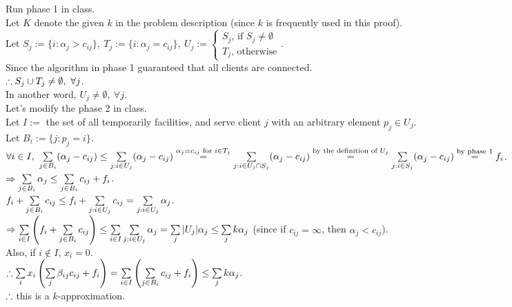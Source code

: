\begin{pr}
Run phase 1 in class.\\
Let $K$ denote the given $k$ in the problem description (since $k$ is frequently used in this proof).\\
Let $S_j:=\{i: \alpha_j>c_{ij}\},\ T_j:=\{i: \alpha_j=c_{ij}\},\ U_j:=\begin{cases}
S_j\text{, if }S_j\neq\emptyset\\
T_j\text{, otherwise}
\end{cases}$.\\
Since the algorithm in phase 1 guaranteed that all clients are connected.\\
$\therefore S_j\cup T_j\neq\emptyset,\ \forall j$.\\
In another word, $U_j\neq\emptyset,\ \forall j$.\\
Let's modify the phase 2 in class.\\
Let $I:=$ the set of all temporarily facilities, and serve client $j$ with an arbitrary element $p_j\in U_j$.\\
Let $B_i:=\{j:p_j=i\}$.\\
$\forall i\in I,\ \sum\limits_{j\in B_i}(\alpha_j-c_{ij})\leq\sum\limits_{j:i\in U_j}(\alpha_j-c_{ij})\overset{\alpha_j=c_{ij}\text{ for }i\in T_j}=\sum\limits_{j:i\in U_j\cap S_j}(\alpha_j-c_{ij})\overset{\text{by the definition of }U_j}=\sum\limits_{j:i\in S_j}(\alpha_j-c_{ij})\overset{\text{by phase 1}}=f_i$.\\
$\Rightarrow\sum\limits_{j\in B_i}\alpha_j\leq\sum\limits_{j\in B_i}c_{ij}+f_i$.\\
$f_i+\sum\limits_{j\in B_i}c_{ij}\leq f_i+\sum\limits_{j:i\in U_j}c_{ij}=\sum\limits_{j:i\in U_j}\alpha_j$.\\
$\Rightarrow\sum\limits_{i\in I}\left(f_i+\sum\limits_{j\in B_i}c_{ij}\right)\leq\sum\limits_{i\in I}\sum\limits_{j:i\in U_j}\alpha_j=\sum\limits_j|U_j|\alpha_j\leq\sum\limits_jk\alpha_j$ (since if $c_{ij}=\infty$, then $\alpha_j<c_{ij}$).\\
Also, if $i\notin I$, $x_i=0$.\\
$\therefore\sum\limits_ix_i\left(\sum\limits_j\beta_{ij}c_{ij}+f_i\right)=\sum\limits_{i\in I}\left(\sum\limits_{j\in B_i}c_{ij}+f_i\right)\leq\sum\limits_jk\alpha_j$.\\
$\therefore$ this is a $k$-approximation.
\end{pr}

